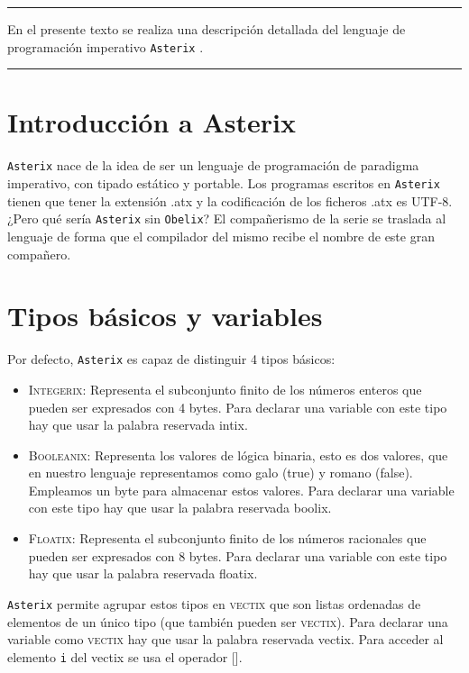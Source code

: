 \documentclass[a4paper, 9pt]{article}
\newcommand{\atx}{\texttt{Asterix} }
\begin{document}
    \begin{small}
        \hrule
        \vspace{\baselineskip}
        En el presente texto se realiza una descripción detallada del lenguaje
        de programación imperativo \atx. 
        \vspace{\baselineskip}\hrule
    \end{small}

    \section*{Introducción a Asterix}
    \atx nace de la idea de ser un lenguaje de programación de paradigma 
    imperativo, con tipado estático y portable. Los programas escritos en \atx tienen que
    tener la extensión .atx y la codificación de los ficheros .atx es UTF-8.
    ¿Pero qué sería \atx sin \texttt{Obelix}? El compañerismo de la serie 
    se traslada al lenguaje de forma que el compilador del mismo recibe el
    nombre de este gran compañero. 

    \section*{Tipos básicos y variables}
    Por defecto, \atx es capaz de distinguir 4 tipos básicos:
    \begin{itemize}
        \item \textsc{Integerix}: Representa el subconjunto finito de los números
            enteros que pueden ser expresados con 4 bytes. Para declarar una
            variable con este tipo hay que usar la palabra reservada \textsf{intix}.
        \item \textsc{Booleanix}: Representa los valores de lógica binaria, esto
            es dos valores, que en nuestro lenguaje representamos como
            \textsf{galo} (true) y \textsf{romano} (false). Empleamos un byte
            para almacenar estos valores. Para declarar una variable con este
            tipo hay que usar la palabra reservada \textsf{boolix}.
        \item \textsc{Floatix}: Representa el subconjunto finito de los números
            racionales que pueden ser expresados con 8 bytes. Para declarar una
            variable con este tipo hay que usar la palabra reservada \textsf{floatix}.
    \end{itemize}

    \atx permite agrupar estos tipos en \textsc{vectix} que son listas ordenadas
    de elementos de un único tipo (que también pueden ser \textsc{vectix}).
    Para declarar una variable como \textsc{vectix} hay que usar la palabra 
    reservada \textsf{vectix}. Para acceder al elemento \texttt{i} del vectix
    se usa el operador [].
\end{document}
